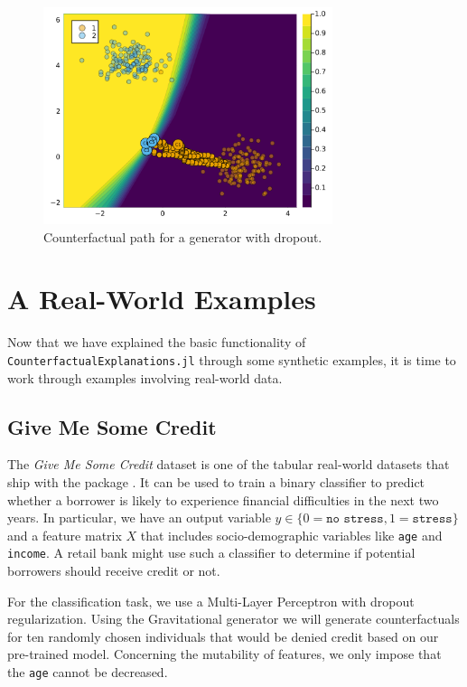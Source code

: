 \documentclass{juliacon}
\begin{document}
\begin{figure}

{\centering \includegraphics[width=3.33333in,height=2.5in]{www/dropout.png}

}

\caption{\label{fig-dropout}Counterfactual path for a generator with
dropout.}

\end{figure}

\hypertarget{sec-emp}{%
\section{A Real-World Examples}\label{sec-emp}}

Now that we have explained the basic functionality of
\texttt{CounterfactualExplanations.jl} through some synthetic examples,
it is time to work through examples involving real-world data.

\hypertarget{give-me-some-credit}{%
\subsection{Give Me Some Credit}\label{give-me-some-credit}}

The \emph{Give Me Some Credit} dataset is one of the tabular real-world
datasets that ship with the package \autocite{kaggle2011give}. It can be
used to train a binary classifier to predict whether a borrower is
likely to experience financial difficulties in the next two years. In
particular, we have an output variable
\(y \in \{0=\texttt{no stress},1=\texttt{stress}\}\) and a feature
matrix \(X\) that includes socio-demographic variables like \texttt{age}
and \texttt{income}. A retail bank might use such a classifier to
determine if potential borrowers should receive credit or not.

For the classification task, we use a Multi-Layer Perceptron with
dropout regularization. Using the Gravitational generator
\autocite{altmeyer2023endogenous} we will generate counterfactuals for
ten randomly chosen individuals that would be denied credit based on our
pre-trained model. Concerning the mutability of features, we only impose
that the \texttt{age} cannot be decreased.
\end{document}
